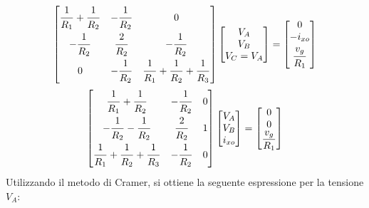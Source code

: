 \documentclass{article}
\begin{document}
\begin{gather*}
    \begin{bmatrix}
        \displaystyle\frac{\strut1}{\strut R_1}+\displaystyle\frac{\strut1}{\strut R_2}&-\displaystyle\frac{\strut1}{\strut R_2}&0\\
        -\displaystyle\frac{\strut1}{\strut R_2}&\displaystyle\frac{\strut2}{\strut R_2}&-\displaystyle\frac{\strut1}{\strut R_2}\\
        0&-\displaystyle\frac{\strut1}{\strut R_2}&\displaystyle\frac{\strut1}{\strut R_1}+\displaystyle\frac{\strut1}{\strut R_2}+\displaystyle\frac{\strut1}{\strut R_3}
    \end{bmatrix}\begin{bmatrix}
        V_A\\V_B\\V_C=V_A
    \end{bmatrix}=\begin{bmatrix}
        0\\-i_{xo}\\\displaystyle\frac{\strut v_g}{\strut R_1}
    \end{bmatrix}\\
    \begin{bmatrix}
        \displaystyle\frac{\strut1}{\strut R_1}+\displaystyle\frac{\strut1}{\strut R_2}&-\displaystyle\frac{\strut1}{\strut R_2}&0\\
        -\displaystyle\frac{\strut1}{\strut R_2}-\displaystyle\frac{\strut1}{\strut R_2}&\displaystyle\frac{\strut2}{\strut R_2}&1\\
        \displaystyle\frac{\strut1}{\strut R_1}+\displaystyle\frac{\strut1}{\strut R_2}+\displaystyle\frac{\strut1}{\strut R_3}&-\displaystyle\frac{\strut1}{\strut R_2}&0
    \end{bmatrix}\begin{bmatrix}
        V_A\\V_B\\i_{xo}
    \end{bmatrix}=\begin{bmatrix}
        0\\0\\\displaystyle\frac{v_g}{R_1}
    \end{bmatrix}
\end{gather*}
Utilizzando il metodo di Cramer, si ottiene la seguente espressione per la tensione $V_A$:
\end{document}
